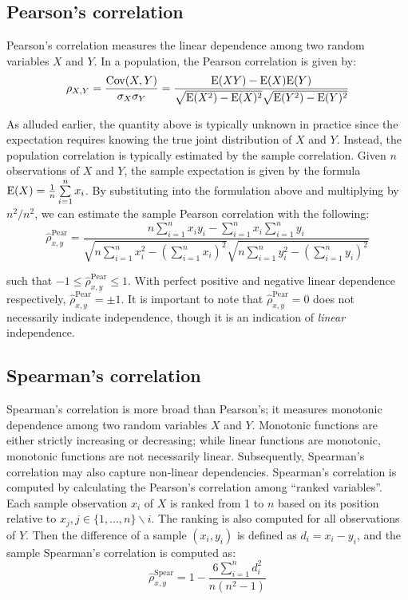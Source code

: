 \subsection{Pearson's correlation}

Pearson's correlation measures the linear dependence among two random variables
$X$ and $Y$. In a population, the Pearson correlation is given by:
$$\rho_{X,Y}=\frac{\mathrm{Cov}(X,Y)}{\sigma_X \sigma_Y} =
\frac{\mathrm{E}(XY)-\mathrm{E}(X)\mathrm{E}(Y)}{\sqrt{\mathrm{E}(X^2)-\mathrm{E}(X)^2} \sqrt{\mathrm{E}(Y^2)-\mathrm{E}(Y)^2}}$$ 

As alluded earlier, the quantity above is typically unknown in practice since 
the expectation requires knowing the true joint distribution of $X$ and $Y$. 
Instead, the population correlation is typically estimated by the sample 
correlation. Given $n$ observations of $X$ and $Y$, the sample expectation is 
given by the formula  
$\mathrm{E}(X)=\frac{1}{n}\sum\limits_{i=1}^{n}x_i$. 
By substituting into the formulation above and multiplying by $n^2/n^2$, we can 
estimate the sample Pearson correlation with the following:
$$\hat{\rho}_{x,y}^\text{Pear}=
\frac{n \sum\limits_{i=1}^{n} x_i y_i - \sum\limits_{i=1}^{n} x_i
	\sum\limits_{i=1}^{n} y_i}
{\sqrt{n\sum\limits_{i=1}^{n} x_i^2-\left(\sum\limits_{i=1}^{n} x_i\right)^2} 
	\sqrt{n\sum\limits_{i=1}^{n} y_i^2-\left(\sum\limits_{i=1}^{n} y_i\right)^2}}$$ 

\noindent such that $-1 \leq \hat{\rho}_{x,y}^\text{Pear} \leq 1$. With perfect 
positive and negative linear 
dependence respectively, $\hat{\rho}_{x,y}^\text{Pear}=\pm1$.
It is important to note that $\hat{\rho}_{x,y}^\text{Pear}=0$ does not 
necessarily indicate independence, though it is an indication of 
\textit{linear} independence.

\subsection{Spearman's correlation}

Spearman's correlation is more broad than Pearson's; it measures monotonic
dependence among two random variables $X$ and $Y$. Monotonic functions are
either strictly increasing or decreasing; while linear functions are monotonic,
monotonic functions are not necessarily linear. Subsequently, Spearman's
correlation may also capture non-linear dependencies. Spearman's correlation is
computed by calculating the Pearson's correlation among ``ranked variables''. 
Each sample observation $x_i$ of $X$ is ranked from 1 to $n$ based on its 
position relative to $x_j, j\in\{1,...,n\}\backslash{i}$. The ranking is also 
computed for all observations of $Y$. Then the difference of a sample 
$(x_i,y_i)$ is defined as $d_i=x_i-y_i$, and the sample Spearman's correlation 
is computed as:
$$\hat{\rho}_{x,y}^{\text{Spear}}=
1-\frac{6 \sum\limits_{i=1}^{n}d_i^2}{n(n^2-1)}$$

